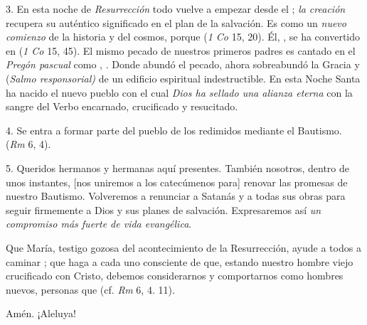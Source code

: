\begin{body}
3. En esta noche de \textit{Resurrección} todo vuelve a empezar desde el ; \textit{la creación} recupera su auténtico significado en el plan de la salvación. Es como un \textit{nuevo comienzo} de la historia y del cosmos, porque  (\textit{1 Co} 15, 20). Él, , se ha convertido en  (\textit{1 Co} 15, 45). El mismo pecado de nuestros primeros padres es cantado en el \textit{Pregón pascual} como , . Donde abundó el pecado, ahora sobreabundó la Gracia y  (\textit{Salmo responsorial)} de un edificio espiritual indestructible. En esta Noche Santa ha nacido el nuevo pueblo con el cual \textit{Dios ha sellado una alianza eterna} con la sangre del Verbo encarnado, crucificado y resucitado.

4. Se entra a formar parte del pueblo de los redimidos mediante el Bautismo.  (\textit{Rm} 6, 4).


5. Queridos hermanos y hermanas aquí presentes. También nosotros, dentro de unos instantes, [nos uniremos a los catecúmenos para] renovar las promesas de nuestro Bautismo. Volveremos a renunciar a Satanás y a todas sus obras para seguir firmemente a Dios y sus planes de salvación. Expresaremos así \textit{un compromiso más fuerte de vida evangélica}.

Que María, testigo gozosa del acontecimiento de la Resurrección, ayude a todos a caminar ; que haga a cada uno consciente de que, estando nuestro hombre viejo crucificado con Cristo, debemos considerarnos y comportarnos como hombres nuevos, personas que  (cf. \textit{Rm} 6, 4. 11).

Amén. ¡Aleluya!
\end{body}


